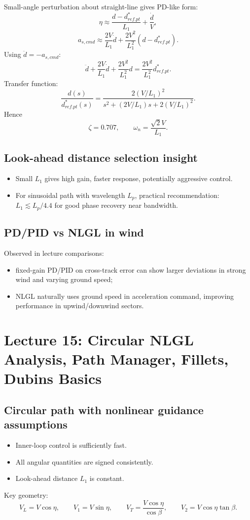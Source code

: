\documentclass[11pt,a4paper]{article}
\begin{document}
Small-angle perturbation about straight-line gives PD-like form:
\[
\eta\approx \frac{d-d^*_{ref.pt}}{L_1}+\frac{\dot d}{V},
\]
\[
a_{s,cmd}\approx \frac{2V}{L_1}\dot d+\frac{2V^2}{L_1^2}(d-d^*_{ref.pt}).
\]
Using $\ddot d=-a_{s,cmd}$:
\[
\ddot d+\frac{2V}{L_1}\dot d+\frac{2V^2}{L_1^2}d=\frac{2V^2}{L_1^2}d^*_{ref.pt}.
\]
Transfer function:
\[
\frac{d(s)}{d^*_{ref.pt}(s)}
=\frac{2(V/L_1)^2}{s^2+(2V/L_1)s+2(V/L_1)^2}.
\]
Hence
\[
\zeta=0.707,\qquad \omega_n=\frac{\sqrt{2}V}{L_1}.
\]

\subsection{Look-ahead distance selection insight}
\begin{itemize}
  \item Small $L_1$ gives high gain, faster response, potentially aggressive control.
  \item For sinusoidal path with wavelength $L_p$, practical recommendation: $L_1\lesssim L_p/4.4$ for good phase recovery near bandwidth.
\end{itemize}

\subsection{PD/PID vs NLGL in wind}
Observed in lecture comparisons:
\begin{itemize}
  \item fixed-gain PD/PID on cross-track error can show larger deviations in strong wind and varying ground speed;
  \item NLGL naturally uses ground speed in acceleration command, improving performance in upwind/downwind sectors.
\end{itemize}

\newpage
\section{Lecture 15: Circular NLGL Analysis, Path Manager, Fillets, Dubins Basics}

\subsection{Circular path with nonlinear guidance assumptions}
\begin{itemize}
  \item Inner-loop control is sufficiently fast.
  \item All angular quantities are signed consistently.
  \item Look-ahead distance $L_1$ is constant.
\end{itemize}
Key geometry:
\[
V_L=V\cos\eta,\qquad V_1=V\sin\eta,\qquad
V_T=\frac{V\cos\eta}{\cos\beta},\qquad V_2=V\cos\eta\tan\beta.
\]
\end{document}
